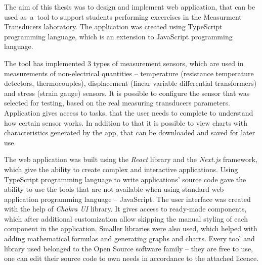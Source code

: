 The aim of this thesis was to design and implement web application, that can be used as~a~tool to
support students performing excercises in the Measurment Transducers laboratory. The application was
created using TypeScript programming language, which is an extension to JavaScript programming
language.

The tool has implemented 3 types of measurement sensors, which are used in measurements of
non-electrical quantities -- temperature (resistance temperature detectors, thermocouples),
displacement (linear variable differential transformers) and stress (strain gauge) sensors. It is
possible to configure the sensor that was selected for testing, based on the real measuring
transducers parameters. Application gives access to tasks, that the user needs to complete to
understand how certain sensor works. In addition to that it is possible to view charts with
characteristics generated by the app, that can be downloaded and saved for later use.

The web application was built using the \textit{React} library and the \textit{Next.js} framework,
which give the ability to create complex and interactive applications. Using TypeScript programming
language to write applications' source code gave the ability to use the tools that are not available
when using standard web application programming language -- JavaScript. The user interface was
created with the help of \textit{Chakra UI} library. It gives access to ready-made components, which
after additional customization allow skipping the manual styling of each component in the
application. Smaller libraries were also used, which helped with adding mathematical formulas and
generating graphs and charts. Every tool and library used belonged to the Open Source software
family -- they are free to use, one can edit their source code to own needs in accordance to the
attached licence.